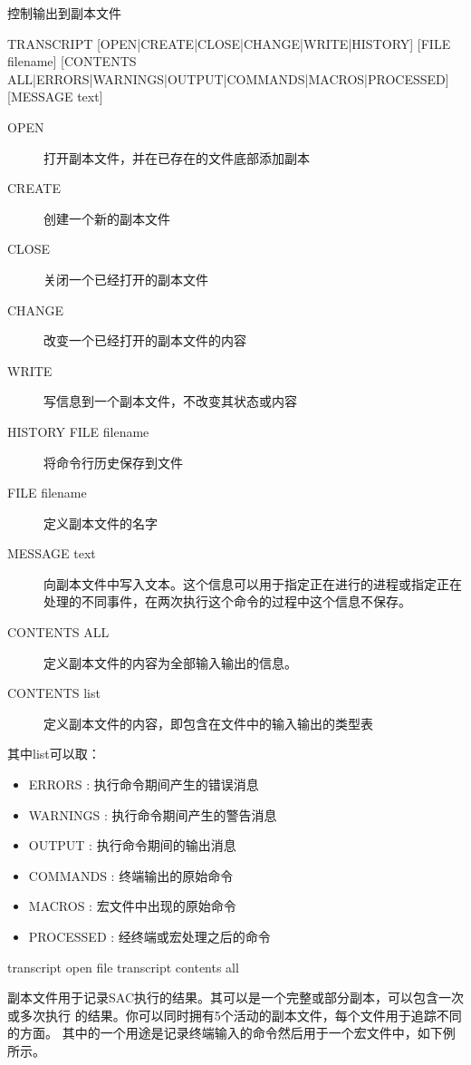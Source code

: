 \label{cmd:transcript}

控制输出到副本文件

\begin{SACSTX}
TRANSCRIPT [OPEN|CREATE|CLOSE|CHANGE|WRITE|HISTORY] [FILE filename]
    [CONTENTS ALL|ERRORS|WARNINGS|OUTPUT|COMMANDS|MACROS|PROCESSED]
    [MESSAGE text]
\end{SACSTX}

\begin{description}
\item [OPEN] 打开副本文件，并在已存在的文件底部添加副本
\item [CREATE] 创建一个新的副本文件
\item [CLOSE] 关闭一个已经打开的副本文件
\item [CHANGE] 改变一个已经打开的副本文件的内容
\item [WRITE] 写信息到一个副本文件，不改变其状态或内容
\item [HISTORY FILE filename] 将命令行历史保存到文件
\item [FILE filename] 定义副本文件的名字
\item [MESSAGE text] 向副本文件中写入文本。这个信息可以用于指定正在进行的进程或指定正在
    处理的不同事件，在两次执行这个命令的过程中这个信息不保存。
\item [CONTENTS ALL] 定义副本文件的内容为全部输入输出的信息。
\item [CONTENTS list] 定义副本文件的内容，即包含在文件中的输入输出的类型表
\end{description}
其中list可以取：
\begin{itemize}
\item ERRORS : 执行命令期间产生的错误消息
\item WARNINGS : 执行命令期间产生的警告消息
\item OUTPUT : 执行命令期间的输出消息
\item COMMANDS : 终端输出的原始命令
\item MACROS : 宏文件中出现的原始命令
\item PROCESSED : 经终端或宏处理之后的命令
\end{itemize}

\begin{SACDFT}
transcript open file transcript contents all
\end{SACDFT}

副本文件用于记录SAC执行的结果。其可以是一个完整或部分副本，可以包含一次或多次执行
的结果。你可以同时拥有5个活动的副本文件，每个文件用于追踪不同的方面。
其中的一个用途是记录终端输入的命令然后用于一个宏文件中，如下例所示。

